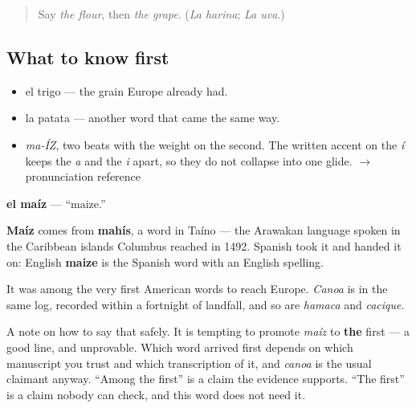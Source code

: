 \label{lesson:ES-C376-maiz}



\begin{quote}
Say \emph{the flour}, then \emph{the grape}. (\emph{La harina}; \emph{La uva}.)
\end{quote}

\subsection*{What to know first}
\begin{itemize}
\raggedright
  \item el trigo — the grain Europe already had.
  \item la patata — another word that came the same way.
\end{itemize}

\begin{sounds}
\begin{itemize}
\raggedright
  \item \emph{ma-ÍZ}, two beats with the weight on the second. The written accent on the \emph{í} keeps the \emph{a} and the \emph{i} apart, so they do not collapse into one glide. $\to$ pronunciation reference
\end{itemize}
\end{sounds}

\begin{cousinweb}
\textbf{el maíz} — \textquotedblleft{}maize.\textquotedblright{}

\textbf{Maíz} comes from \textbf{mahís}, a word in Taíno — the Arawakan language spoken in the Caribbean islands Columbus reached in 1492. Spanish took it and handed it on: English \textbf{maize} is the Spanish word with an English spelling.

It was among the very first American words to reach Europe. \emph{Canoa} is in the same log, recorded within a fortnight of landfall, and so are \emph{hamaca} and \emph{cacique}.

A note on how to say that safely. It is tempting to promote \emph{maíz} to \textbf{the} first — a good line, and unprovable. Which word arrived first depends on which manuscript you trust and which transcription of it, and \emph{canoa} is the usual claimant anyway. \textquotedblleft{}Among the first\textquotedblright{} is a claim the evidence supports. \textquotedblleft{}The first\textquotedblright{} is a claim nobody can check, and this word does not need it.
\end{cousinweb}

